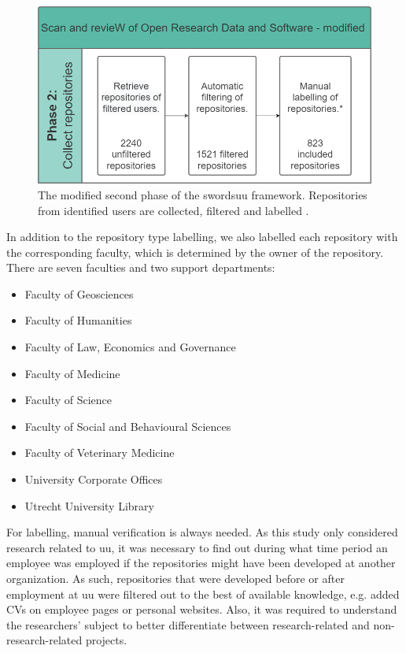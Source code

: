 \begin{figure}[h!]
\centering
\includegraphics[scale=0.45]{figures/SWORDS-thesis-phase2.drawio.png}
\caption{The modified second phase of the \acrshort{swordsuu} framework. Repositories from identified users are collected, filtered and labelled \cite{de_Bruin_Scan_and_revieW_2021}.
\label{fig:phase2}}
\end{figure}
In addition to the repository type labelling, we also labelled each repository with the corresponding faculty, which is determined by the owner of the repository. There are seven faculties and two support departments:
\begin{itemize}
    \item Faculty of Geosciences
    \item Faculty of Humanities
    \item Faculty of Law, Economics and Governance
    \item Faculty of Medicine
    \item Faculty of Science
    \item Faculty of Social and Behavioural Sciences
    \item Faculty of Veterinary Medicine
    \item University Corporate Offices
    \item Utrecht University Library
\end{itemize}
For labelling, manual verification is always needed. As this study only considered research related to \acrshort{uu}, it was necessary to find out during what time period an employee was employed if the repositories might have been developed at another organization. As such, repositories that were developed before or after employment at \acrshort{uu} were filtered out to the best of available knowledge, e.g. added CVs on employee pages or personal websites. Also, it was required to understand the researchers' subject to better differentiate between research-related and non-research-related projects.

